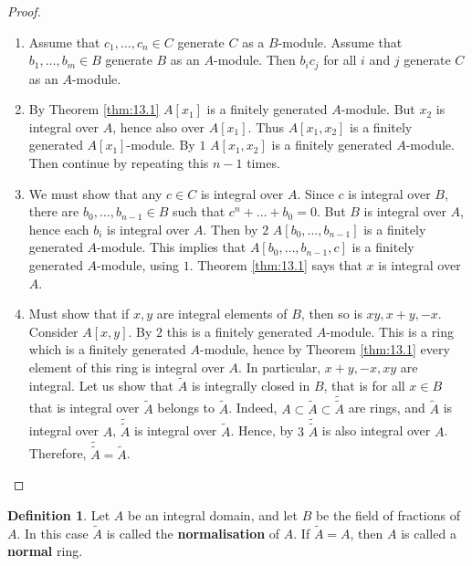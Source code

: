 \documentclass{article}
\renewcommand{\sb}[1]{\left[ #1 \right]}
\theoremstyle{definition}\newtheorem{definition}{Definition}[section]
\theoremstyle{definition}\newtheorem{remark}[definition]{Remark}
\theoremstyle{definition}\newtheorem*{example}{Example}
\theoremstyle{definition}\newtheorem*{note}{Note}
\begin{document}
\begin{proof}
\hfill
\begin{enumerate}
\item Assume that $ c_1, \dots, c_n \in C $ generate $ C $ as a $ B $-module. Assume that $ b_1, \dots, b_m \in B $ generate $ B $ as an $ A $-module. Then $ b_ic_j $ for all $ i $ and $ j $ generate $ C $ as an $ A $-module.
\item By Theorem \ref{thm:13.1} $ A\sb{x_1} $ is a finitely generated $ A $-module. But $ x_2 $ is integral over $ A $, hence also over $ A\sb{x_1} $. Thus $ A\sb{x_1, x_2} $ is a finitely generated $ A\sb{x_1} $-module. By $ 1 $ $ A\sb{x_1, x_2} $ is a finitely generated $ A $-module. Then continue by repeating this $ n - 1 $ times.
\item We must show that any $ c \in C $ is integral over $ A $. Since $ c $ is integral over $ B $, there are $ b_0, \dots, b_{n - 1} \in B $ such that $ c^n + \dots + b_0 = 0 $. But $ B $ is integral over $ A $, hence each $ b_i $ is integral over $ A $. Then by $ 2 $ $ A\sb{b_0, \dots, b_{n - 1}} $ is a finitely generated $ A $-module. This implies that $ A\sb{b_0, \dots, b_{n - 1}, c} $ is a finitely generated $ A $-module, using $ 1 $. Theorem \ref{thm:13.1} says that $ x $ is integral over $ A $.
\item Must show that if $ x, y $ are integral elements of $ B $, then so is $ xy, x + y, -x $. Consider $ A\sb{x, y} $. By $ 2 $ this is a finitely generated $ A $-module. This is a ring which is a finitely generated $ A $-module, hence by Theorem \ref{thm:13.1} every element of this ring is integral over $ A $. In particular, $ x + y, -x, xy $ are integral. Let us show that $ \widetilde{A} $ is integrally closed in $ B $, that is for all $ x \in B $ that is integral over $ \widetilde{A} $ belongs to $ \widetilde{A} $. Indeed, $ A \subset \widetilde{A} \subset \widetilde{\widetilde{A}} $ are rings, and $ \widetilde{A} $ is integral over $ A $, $ \widetilde{\widetilde{A}} $ is integral over $ \widetilde{A} $. Hence, by $ 3 $ $ \widetilde{\widetilde{A}} $ is also integral over $ A $. Therefore, $ \widetilde{\widetilde{A}} = \widetilde{A} $.
\end{enumerate}
\end{proof}


\begin{definition}
Let $ A $ be an integral domain, and let $ B $ be the field of fractions of $ A $. In this case $ \widetilde{A} $ is called the \textbf{normalisation} of $ A $. If $ \widetilde{A} = A $, then $ A $ is called a \textbf{normal} ring.
\end{definition}
\end{document}
